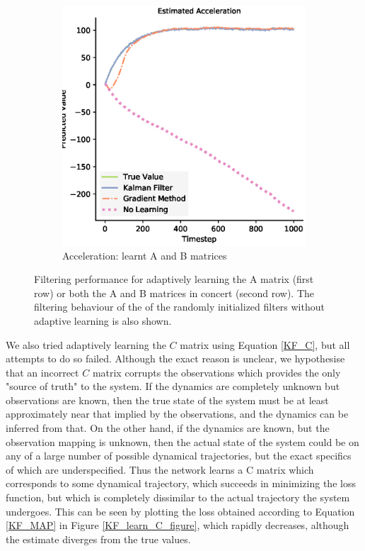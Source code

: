 \begin{figure}[H]
\begin{subfigure}{0.33\textwidth}
    \centering
    \includegraphics[width=.8\linewidth]{chapter_3_figures/Estimated_Acceleration_AB_matrix.eps}
    \caption{Acceleration: learnt A and B matrices}
  \end{subfigure}
  \caption{Filtering performance for adaptively learning the A matrix (first row) or both the A and B matrices in concert (second row). The filtering behaviour of the of the randomly initialized filters without adaptive learning is also shown.}
\label{KF_learn_AB_figure}
\end{figure}

We also tried adaptively learning the $C$ matrix using Equation \ref{KF_C}, but all attempts to do so failed. Although the exact reason is unclear, we hypothesise that an incorrect $C$ matrix corrupts the observations which provides the only "source of truth" to the system. If the dynamics are completely unknown but observations are known, then the true state of the system must be at least approximately near that implied by the observations, and the dynamics can be inferred from that. On the other hand, if the dynamics are known, but the observation mapping is unknown, then the actual state of the system could be on any of a large number of possible dynamical trajectories, but the exact specifics of which are underspecified. Thus the network learns a C matrix which corresponds to some dynamical trajectory, which succeeds in minimizing the loss function, but which is completely dissimilar to the actual trajectory the system undergoes. This can be seen by plotting the loss obtained according to Equation \ref{KF_MAP} in Figure \ref{KF_learn_C_figure}, which rapidly decreases, although the estimate diverges from the true values.

